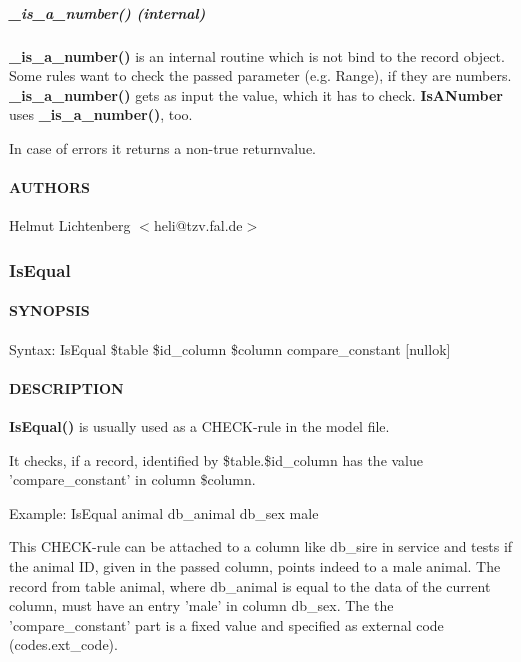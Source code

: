 \subparagraph*{\_is\_a\_number() (internal)\label{IsANumber__is_a_number_internal_}}


\textbf{\_is\_a\_number()} is an internal routine which is not bind to the record
object. Some rules want to check the passed parameter (e.g. Range), if they
are numbers. \textbf{\_is\_a\_number()} gets as input the value, which it has to
check. \textbf{IsANumber} uses \textbf{\_is\_a\_number()}, too.



In case of errors it returns a non-true returnvalue.

\paragraph*{AUTHORS\label{IsANumber_AUTHORS}}


Helmut Lichtenberg $<$heli@tzv.fal.de$>$

\subsubsection{IsEqual\label{IsEqual}}




\paragraph*{SYNOPSIS\label{IsEqual_SYNOPSIS}}


Syntax: IsEqual \$table \$id\_column \$column compare\_constant [nullok]

\paragraph*{DESCRIPTION\label{IsEqual_DESCRIPTION}}


\textbf{IsEqual()} is usually used as a CHECK-rule in the model file.



It checks, if a record, identified by \$table.\$id\_column has the value
'compare\_constant' in column \$column.



Example: IsEqual animal db\_animal db\_sex male



This CHECK-rule can be attached to a column like db\_sire in
service and tests if the animal ID, given in the passed column, points indeed
to a male animal. The record from table animal, where db\_animal is equal to
the data of the current column, must have an entry 'male' in column db\_sex.
The the 'compare\_constant' part is a fixed value and specified as external code
(codes.ext\_code).



